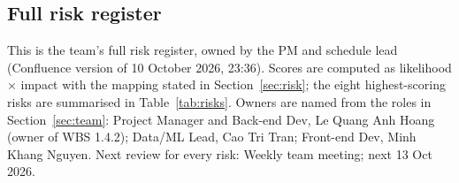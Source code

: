 \begin{landscape}
\section{Full risk register}
\label{app:risk}

This is the team's full risk register, owned by the PM and schedule lead (Confluence version of 10 October 2026, 23:36). Scores are computed as likelihood × impact with the mapping stated in Section~\ref{sec:risk}; the eight highest-scoring risks are summarised in Table~\ref{tab:risks}. Owners are named from the roles in Section~\ref{sec:team}: Project Manager and Back-end Dev, Le Quang Anh Hoang (owner of WBS 1.4.2); Data/ML Lead, Cao Tri Tran; Front-end Dev, Minh Khang Nguyen. Next review for every risk: Weekly team meeting; next 13 Oct 2026.


\end{landscape}
